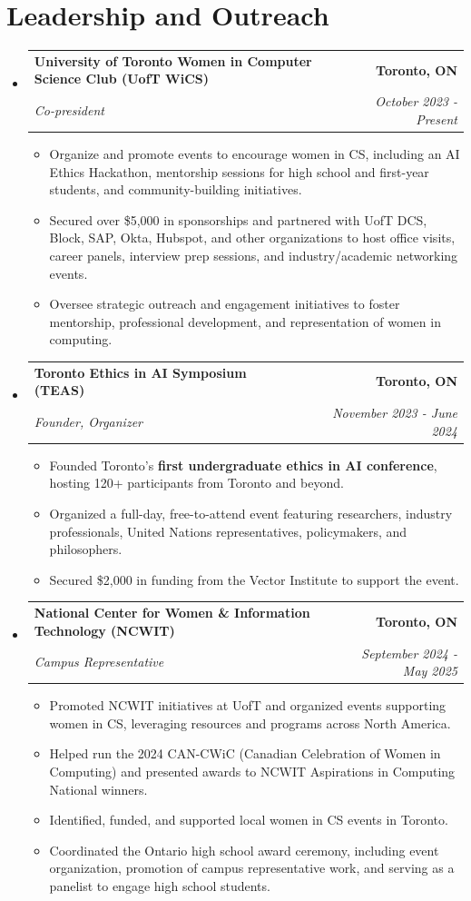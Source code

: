 \documentclass[letterpaper,11pt]{article}
\makeatletter
\newcommand{\resumeItem}[1]{
  \item\small{
    {#1 \vspace{-2pt}}
  }
}
\newcommand{\resumeSubheading}[4]{
  \vspace{6pt}\item   
    \begin{tabular*}{1.0\textwidth}[t]{l@{\extracolsep{\fill}}r}
      \textbf{#1} & \textbf{\small #2} \\
      \textit{\small#3} & \textit{\small #4} \\
    \end{tabular*}\vspace{-3pt}
}
\newcommand{\resumeSubHeadingListStart}{\begin{itemize}[leftmargin=0.0in, label={}]}
\newcommand{\resumeSubHeadingListEnd}{\end{itemize}}
\newcommand{\resumeItemListStart}{\begin{itemize}}
\newcommand{\resumeItemListEnd}{\end{itemize}\vspace{-5pt}}
\makeatother
\begin{document}
\section{Leadership and Outreach}
    \resumeSubHeadingListStart
    \resumeSubheading
      {University of Toronto Women in Computer Science Club (UofT WiCS)}{Toronto, ON}
      {Co-president}{October 2023 - Present}
      \resumeItemListStart
        \resumeItem{Organize and promote events to encourage women in CS, including an AI Ethics Hackathon, mentorship sessions for high school and first-year students, and community-building initiatives.}
        \resumeItem{Secured over \$5,000 in sponsorships and partnered with UofT DCS, Block, SAP, Okta, Hubspot, and other organizations to host office visits, career panels, interview prep sessions, and industry/academic networking events.}
        \resumeItem{Oversee strategic outreach and engagement initiatives to foster mentorship, professional development, and representation of women in computing.}
    \resumeItemListEnd

    \resumeSubheading
    {Toronto Ethics in AI Symposium (TEAS)}{Toronto, ON}
    {Founder, Organizer}{November 2023 - June 2024}
    \resumeItemListStart
        \resumeItem{Founded Toronto’s \textbf{first undergraduate ethics in AI conference}, hosting 120+ participants from Toronto and beyond.}
        \resumeItem{Organized a full-day, free-to-attend event featuring researchers, industry professionals, United Nations representatives, policymakers, and philosophers.}
        \resumeItem{Secured \$2,000 in funding from the Vector Institute to support the event.}
    \resumeItemListEnd

    \resumeSubheading
    {National Center for Women \& Information Technology (NCWIT)}{Toronto, ON}
    {Campus Representative}{September 2024 - May 2025}
    \resumeItemListStart
        \resumeItem{Promoted NCWIT initiatives at UofT and organized events supporting women in CS, leveraging resources and programs across North America.}
        \resumeItem{Helped run the 2024 CAN-CWiC (Canadian Celebration of Women in Computing) and presented awards to NCWIT Aspirations in Computing National winners.}
        \resumeItem{Identified, funded, and supported local women in CS events in Toronto.}
        \resumeItem{Coordinated the Ontario high school award ceremony, including event organization, promotion of campus representative work, and serving as a panelist to engage high school students.}
    \resumeItemListEnd
    \resumeSubHeadingListEnd
\end{document}
